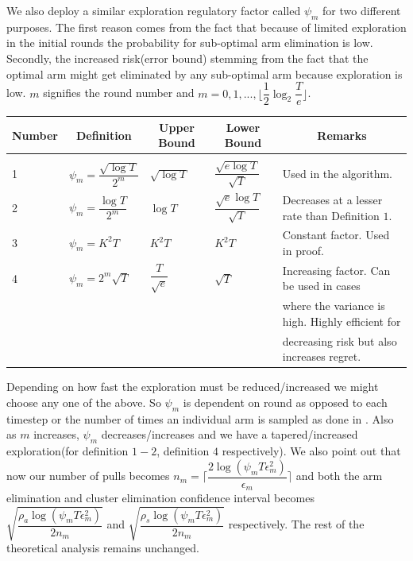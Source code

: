 	We also deploy a similar exploration regulatory factor called $\psi_{m}$ for two different purposes. The first reason comes from the fact that because of limited exploration in the initial rounds the probability for sub-optimal arm elimination is low. Secondly, the increased risk(error bound) stemming from the fact that the optimal arm might get eliminated by any sub-optimal arm because exploration is low. $m$ signifies the round number and $m=0,1,...,\big \lfloor \dfrac{1}{2}\log_{2} \dfrac{T}{e}\big\rfloor$.
	
\begin{center}
\begin{tabular}{l|l|l|l|l}
\multicolumn{1}{c}{\bf Number} &\multicolumn{1}{c}{\bf Definition}  &\multicolumn{1}{c}{\bf Upper Bound} &\multicolumn{1}{c}{\bf Lower Bound} &\multicolumn{1}{c}{\bf Remarks} \\
\hline \\
1	&$\psi_{m}=\dfrac{\sqrt{\log T}}{2^{m}}$         & $\sqrt{\log T}$  &$\dfrac{\sqrt{e\log T}}{\sqrt{T}}$ & Used in the algorithm. \\ 
2	&$\psi_{m}=\dfrac{\log T}{2^{m}}$         & $\log T$  &$\dfrac{\sqrt{e}\log T}{\sqrt{T}}$ & Decreases at a lesser rate than Definition $1$.  \\  
3	&$\psi_{m}=K^{2}T$         & $K^{2} T$  &$K^{2} T$ & Constant factor. Used in proof. \\  
4	&$\psi_{m}=2^{m}\sqrt{T}$         & $\dfrac{T}{\sqrt{e}}$  &$\sqrt{T}$ & Increasing factor. Can be used in cases \\&&&& where the variance is high. Highly efficient for \\&&&& decreasing risk but also increases regret. \\  
\end{tabular}
\end{center}	
	
	Depending on how fast the exploration must be reduced/increased we might choose any one of the above. So $\psi_{m}$ is dependent on round as opposed to each timestep or the number of times an individual arm is sampled as done in \cite{liu2016modification}. Also as $m$ increases, $\psi_{m}$ decreases/increases and we have a tapered/increased exploration(for definition $1-2$, definition $4$ respectively). We also point out that now our number of pulls becomes $n_{m}=\bigg\lceil\dfrac{2\log{(\psi_{m}T\epsilon_{m}^{2})}}{\epsilon_{m}}\bigg\rceil$ and both the arm elimination and cluster elimination confidence interval becomes $\sqrt{\dfrac{\rho_{a}\log{(\psi_{m}T\epsilon_{m}^{2})}}{2 n_{m}}}$ and $\sqrt{\dfrac{\rho_{s} \log{(\psi_{m}T\epsilon_{m}^{2})}}{2 n_{m}}}$  respectively. The rest of the theoretical analysis remains unchanged. 
	
